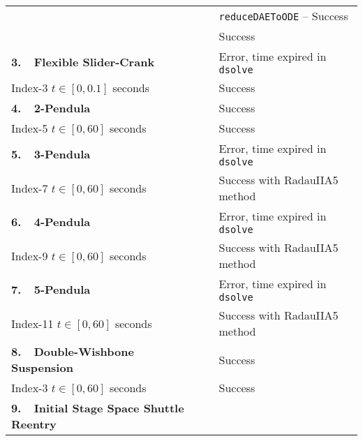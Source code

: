 {\begin{longtable}{lccl}
    &                            & \mycheckmark{}\phantom{\mywarnmark{}} & \texttt{reduceDAEToODE} -- Success \\ \cmidrule{2-4}\cmidrule{2-4}
    & \Indigo{} & \mycheckmark{}\phantom{\mywarnmark{}} & Success \\ \midrule
  \multirow{1}{*}{\textbf{3.~~Flexible Slider-Crank~\cite{lioen1998test, mazzia2008test}}}
    & \Maple{}  & \mycrossmark{}\phantom{\mywarnmark{}} & Error, time expired in \texttt{dsolve} \\ \cmidrule{2-4}
    Index-3 \quad $t \in [0, 0.1]$ seconds & \Indigo{} & \mycheckmark{}\phantom{\mywarnmark{}} & Success \\ \midrule
  \multirow{1}{*}{\textbf{4.~~2-Pendula~\cite{pryce1998solving}}}
    & \Maple{}  & \mycheckmark{}\phantom{\mywarnmark{}} & Success \\ \cmidrule{2-4}
    Index-5 \quad $t \in [0, 60]$ seconds & \Indigo{} & \mycheckmark{}\phantom{\mywarnmark{}} & Success \\ \midrule
  \multirow{1}{*}{\textbf{5.~~3-Pendula~\cite{nedialkov2008solvingIII}}}
    & \Maple{}  & \mycrossmark{}\phantom{\mywarnmark{}} & Error, time expired in \texttt{dsolve} \\ \cmidrule{2-4}
    Index-7 \quad $t \in [0, 60]$ seconds & \Indigo{} & \mycheckmark{}\mywarnmark{} & Success with RadauIIA5 method \\ \midrule
  \multirow{1}{*}{\textbf{6.~~4-Pendula~\cite{nedialkov2008solvingIII}}}
    & \Maple{}  & \mycrossmark{}\phantom{\mywarnmark{}} & Error, time expired in \texttt{dsolve} \\ \cmidrule{2-4}
    Index-9 \quad $t \in [0, 60]$ seconds & \Indigo{} & \mycheckmark{}\mywarnmark{} & Success with RadauIIA5 method \\ \midrule
  \multirow{1}{*}{\textbf{7.~~5-Pendula~\cite{nedialkov2008solvingIII}}}
    & \Maple{}  & \mycrossmark{}\phantom{\mywarnmark{}} & Error, time expired in \texttt{dsolve} \\ \cmidrule{2-4}
    Index-11 \quad $t \in [0, 60]$ seconds & \Indigo{} & \mycheckmark{}\mywarnmark{} & Success with RadauIIA5 method \\ \midrule
  \multirow{1}{*}{\textbf{8.~~Double-Wishbone Suspension}}
    & \Maple{}  & \mycheckmark{}\phantom{\mywarnmark{}} & Success \\ \cmidrule{2-4}
    Index-3 \quad $t \in [0, 60]$ seconds & \Indigo{} & \mycheckmark{}\phantom{\mywarnmark{}} & Success \\ \midrule
  \multirow{1}{*}{\textbf{9.~~Initial Stage Space Shuttle Reentry~\cite{brenan1995numerical}}}

\end{longtable}}
